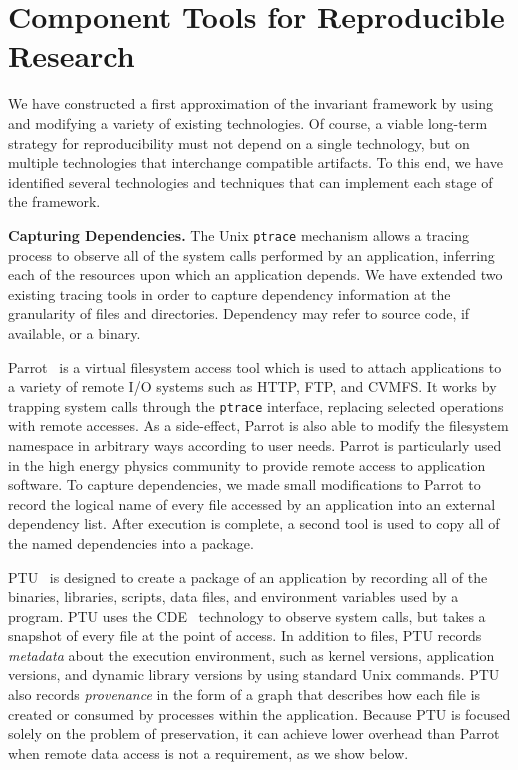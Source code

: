 \section{Component Tools for Reproducible Research}

We have constructed a first approximation of the invariant framework
by using and modifying a variety of existing technologies.  Of course,
a viable long-term strategy for reproducibility must not depend on a single
technology, but on multiple technologies that interchange compatible artifacts.
To this end, we have identified several technologies and techniques
that can implement each stage of the framework.

{\bf Capturing Dependencies.}  The Unix {\tt ptrace} mechanism
allows a tracing process to observe all of the system calls performed by
an application, inferring each of the resources upon which an application
depends.  We have extended two existing tracing tools in order to capture
dependency information at the granularity of files and directories. 
Dependency may refer to source code, if available, or a binary.

Parrot~\cite{thain2005parrot} is a virtual filesystem access tool which
is used to attach applications to a variety of remote I/O systems such as HTTP, FTP, and CVMFS. It works by trapping system calls through the {\tt ptrace} interface,
replacing selected operations with remote accesses.  As a side-effect, Parrot is
also able to modify the filesystem namespace in arbitrary ways according to user
needs.  Parrot is particularly used in the high energy physics community
to provide remote access to application software.
To capture dependencies, we made small modifications to Parrot to record
the logical name of every file accessed by an application into an external
dependency list.  After execution is complete, a second tool is used to copy
all of the named dependencies into a package.

PTU~\cite{PTU,pham2014framework} is designed to create a package of an application by recording all of the binaries, libraries, scripts, data files, and environment variables used by a program.   PTU uses the CDE~\cite{guo2011cde} technology to observe system calls, but takes a snapshot of every file at the point of access.  In addition to files, PTU records \emph{metadata} about the execution environment, such as kernel versions, application versions, and dynamic library versions by using standard Unix commands.  PTU also records \emph{provenance} in the form of a graph that describes how each file is created or consumed by processes within the application.  Because PTU is focused solely on the problem of preservation, it can achieve lower overhead than Parrot when remote data access is not a requirement, as we show below.

